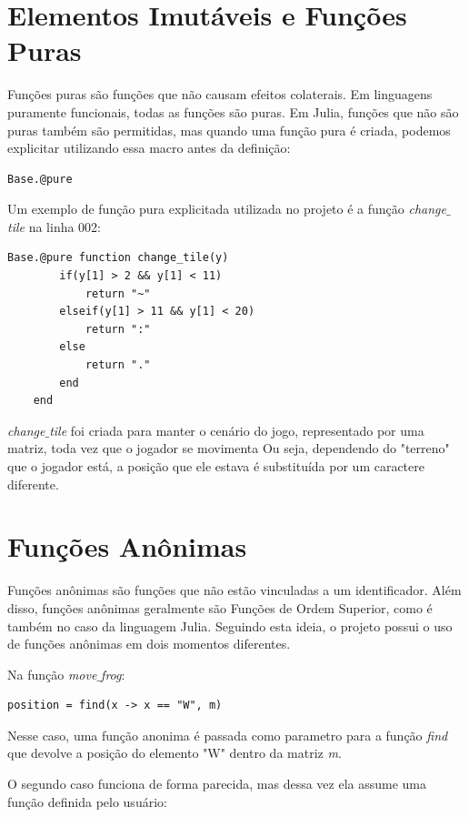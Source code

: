 \documentclass[rel_mlp]{iiufrgs}
\begin{document}
 \section{Elementos Imutáveis e Funções Puras}
 
 Funções puras são funções que não causam efeitos colaterais. Em linguagens puramente funcionais, todas as funções são puras. Em Julia, funções que não são puras também são permitidas, mas quando uma função pura é criada, podemos explicitar utilizando essa macro antes da definição:
    \begin{lstlisting}[frame=single]
    Base.@pure
    \end{lstlisting}
    
 Um exemplo de função pura explicitada utilizada no projeto é a função \textit{change$\_$tile} na linha 002:
    \begin{lstlisting}[frame=single]
    Base.@pure function change_tile(y)
    	if(y[1] > 2 && y[1] < 11)
    		return "~"
    	elseif(y[1] > 11 && y[1] < 20)
    		return ":"
    	else
    		return "."
    	end
    end
    \end{lstlisting}
    
   \textit{change$\_$tile} foi criada para manter o cenário do jogo, representado por uma matriz, toda vez que o jogador se movimenta Ou seja, dependendo do "terreno" que o jogador está, a posição que ele estava é substituída por um caractere diferente.
 
 \section{Funções Anônimas}
    
    Funções anônimas são funções que não estão vinculadas a um identificador. Além disso, funções anônimas geralmente são Funções de Ordem Superior, como é também no caso da linguagem Julia. Seguindo esta ideia, o projeto possui o uso de funções anônimas em dois momentos diferentes.
    
    Na função \textit{move$\_$frog}:
    \begin{lstlisting}[frame=single]
    position = find(x -> x == "W", m)
    \end{lstlisting}
    
    Nesse caso, uma função anonima é passada como parametro para a função \textit{find} que devolve a posição do elemento "W" dentro da matriz \textit{m}. 
    
    O segundo caso funciona de forma parecida, mas dessa vez ela assume uma função definida pelo usuário:
    
\end{document}
